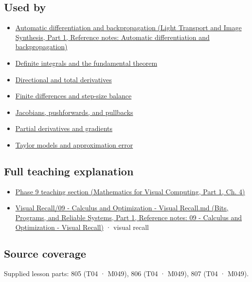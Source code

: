 \subsection{Used by}\label{appendix-7bc181935c42-used-by}

\hypertarget{appendix-7bc181935c42-used-by}{}

\begin{itemize}
\tightlist
\item
  \href{../04-Light-Transport-and-Image-Synthesis-P01/main.pdf\#appendix-40df0855b4a7}{Automatic differentiation and backpropagation (Light Transport and Image Synthesis, Part 1, Reference notes: Automatic differentiation and backpropagation)}
\item
  \hyperref[appendix-1a50e72435c2]{Definite integrals and the fundamental theorem}
\item
  \hyperref[appendix-e2d476574aab]{Directional and total derivatives}
\item
  \hyperref[appendix-e2d7b4f2161d]{Finite differences and step-size balance}
\item
  \hyperref[appendix-d8a7ddb675eb]{Jacobians, pushforwards, and pullbacks}
\item
  \hyperref[appendix-677b59746ae0]{Partial derivatives and gradients}
\item
  \hyperref[appendix-32f39e9a3738]{Taylor models and approximation error}
\end{itemize}

\subsection{Full teaching explanation}\label{appendix-7bc181935c42-full-teaching-explanation}

\hypertarget{appendix-7bc181935c42-full-teaching-explanation}{}

\begin{itemize}
\tightlist
\item
  \href{../02-Mathematics-for-Visual-Computing-P01/main.pdf\#01-foundations-i-ch020-functions-limits-continuity-and-scalar-change}{Phase 9 teaching section (Mathematics for Visual Computing, Part 1, Ch. 4)}
\item
  \href{../01-Bits-Programs-and-Reliable-Systems-P01/main.pdf\#appendix-adf48f5dc5c1}{Visual Recall/09 - Calculus and Optimization - Visual Recall.md (Bits, Programs, and Reliable Systems, Part 1, Reference notes: 09 - Calculus and Optimization - Visual Recall)} · visual recall
\end{itemize}

\subsection{Source coverage}\label{appendix-7bc181935c42-source-coverage}

\hypertarget{appendix-7bc181935c42-source-coverage}{}

Supplied lesson parts: 805 (T04 · M049), 806 (T04 · M049), 807 (T04 · M049).
